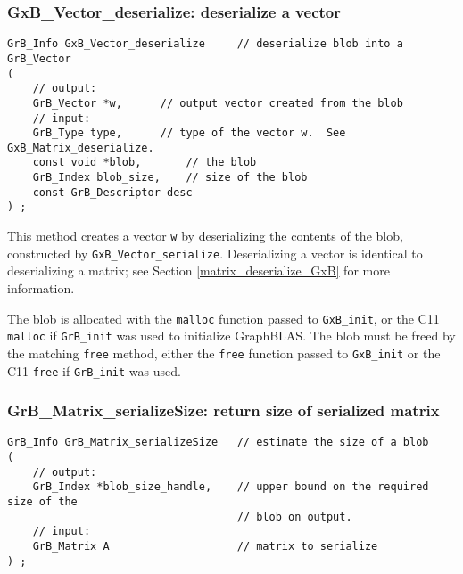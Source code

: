 \documentclass[12pt]{article}
\begin{document}
\subsubsection{{\sf GxB\_Vector\_deserialize:}    deserialize a vector}
\label{vector_deserialize_GxB}

\begin{mdframed}[userdefinedwidth=6in]
{\footnotesize
\begin{verbatim}
GrB_Info GxB_Vector_deserialize     // deserialize blob into a GrB_Vector
(
    // output:
    GrB_Vector *w,      // output vector created from the blob
    // input:
    GrB_Type type,      // type of the vector w.  See GxB_Matrix_deserialize.
    const void *blob,       // the blob
    GrB_Index blob_size,    // size of the blob
    const GrB_Descriptor desc
) ;
\end{verbatim}
} \end{mdframed}

This method creates a vector \verb'w' by deserializing the contents of the
blob, constructed by
\verb'GxB_Vector_serialize'.
Deserializing a vector is identical to deserializing a matrix;
see Section \ref{matrix_deserialize_GxB} for more information.

The blob is allocated with the \verb'malloc' function passed to
\verb'GxB_init', or the C11 \verb'malloc' if \verb'GrB_init' was used
to initialize GraphBLAS.  The blob must be freed by the matching \verb'free'
method, either the \verb'free' function passed to \verb'GxB_init' or
the C11 \verb'free' if \verb'GrB_init' was used.

\subsubsection{{\sf GrB\_Matrix\_serializeSize:}  return size of serialized matrix}
\label{matrix_serialize_size}

\begin{mdframed}[userdefinedwidth=6in]
{\footnotesize
\begin{verbatim}
GrB_Info GrB_Matrix_serializeSize   // estimate the size of a blob
(
    // output:
    GrB_Index *blob_size_handle,    // upper bound on the required size of the
                                    // blob on output.
    // input:
    GrB_Matrix A                    // matrix to serialize
) ;
\end{verbatim}
} \end{mdframed}
\end{document}
